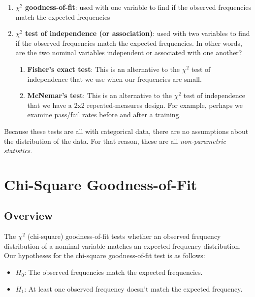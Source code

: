 \documentclass[
]{book}
\begin{document}
\begin{enumerate}
\def\labelenumi{\arabic{enumi}.}
\item
  \(\chi^2\) \textbf{goodness-of-fit}: used with one variable to find if the observed frequencies match the expected frequencies
\item
  \(\chi^2\) \textbf{test of independence (or association)}: used with two variables to find if the observed frequencies match the expected frequencies. In other words, are the two nominal variables independent or associated with one another?

  \begin{enumerate}
  \def\labelenumii{\arabic{enumii}.}
  \item
    \textbf{Fisher's exact test}: This is an alternative to the \(\chi^2\) test of independence that we use when our frequencies are small.
  \item
    \textbf{McNemar's test}: This is an alternative to the \(\chi^2\) test of independence that we have a 2x2 repeated-measures design. For example, perhaps we examine pass/fail rates before and after a training.
  \end{enumerate}
\end{enumerate}

Because these tests are all with categorical data, there are no assumptions about the distribution of the data. For that reason, these are all \emph{non-parametric statistics}.

\hypertarget{chi-square-goodness-of-fit}{%
\section{Chi-Square Goodness-of-Fit}\label{chi-square-goodness-of-fit}}

\hypertarget{overview-3}{%
\subsection{Overview}\label{overview-3}}

The \(\chi^2\) (chi-square) goodness-of-fit tests whether an observed frequency distribution of a nominal variable matches an expected frequency distribution. Our hypotheses for the chi-square goodness-of-fit test is as follows:

\begin{itemize}
\item
  \(H_0\): The observed frequencies match the expected frequencies.
\item
  \(H_1\): At least one observed frequency doesn't match the expected frequency.
\end{itemize}
\end{document}
